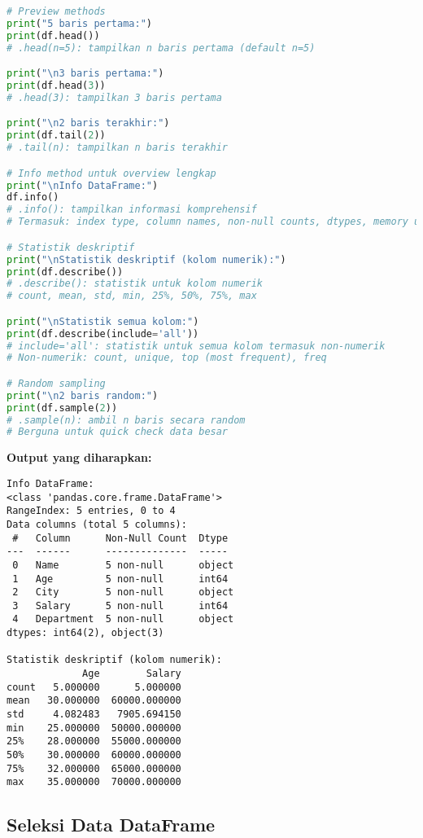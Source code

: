 \begin{lstlisting}[language=python, caption={Methods untuk Eksplorasi Data}, style=python]
# Preview methods
print("5 baris pertama:")
print(df.head())
# .head(n=5): tampilkan n baris pertama (default n=5)

print("\n3 baris pertama:")
print(df.head(3))
# .head(3): tampilkan 3 baris pertama

print("\n2 baris terakhir:")
print(df.tail(2))
# .tail(n): tampilkan n baris terakhir

# Info method untuk overview lengkap
print("\nInfo DataFrame:")
df.info()
# .info(): tampilkan informasi komprehensif
# Termasuk: index type, column names, non-null counts, dtypes, memory usage

# Statistik deskriptif
print("\nStatistik deskriptif (kolom numerik):")
print(df.describe())
# .describe(): statistik untuk kolom numerik
# count, mean, std, min, 25%, 50%, 75%, max

print("\nStatistik semua kolom:")
print(df.describe(include='all'))
# include='all': statistik untuk semua kolom termasuk non-numerik
# Non-numerik: count, unique, top (most frequent), freq

# Random sampling
print("\n2 baris random:")
print(df.sample(2))
# .sample(n): ambil n baris secara random
# Berguna untuk quick check data besar
\end{lstlisting}

\textbf{Output yang diharapkan:}
\begin{lstlisting}[style=bash]
Info DataFrame:
<class 'pandas.core.frame.DataFrame'>
RangeIndex: 5 entries, 0 to 4
Data columns (total 5 columns):
 #   Column      Non-Null Count  Dtype
---  ------      --------------  -----
 0   Name        5 non-null      object
 1   Age         5 non-null      int64
 2   City        5 non-null      object
 3   Salary      5 non-null      int64
 4   Department  5 non-null      object
dtypes: int64(2), object(3)

Statistik deskriptif (kolom numerik):
             Age        Salary
count   5.000000      5.000000
mean   30.000000  60000.000000
std     4.082483   7905.694150
min    25.000000  50000.000000
25%    28.000000  55000.000000
50%    30.000000  60000.000000
75%    32.000000  65000.000000
max    35.000000  70000.000000
\end{lstlisting}

\subsection*{Seleksi Data DataFrame}

